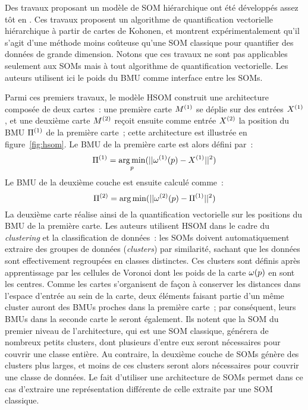\documentclass[../main]{subfiles}
\begin{document}
Des travaux proposant un modèle de SOM hiérarchique ont été développés assez tôt en \cite{luttrell_hierarchical_1989}. 
Ces travaux proposent un algorithme de quantification vectorielle hiérarchique à partir de cartes de Kohonen, et montrent expérimentalement qu'il s'agit d'une méthode moins coûteuse qu'une SOM classique pour quantifier des données de grande dimension. Notons que ces travaux ne sont pas applicables seulement aux SOMs mais à tout algorithme de quantification vectorielle. Les auteurs utilisent ici le poids du BMU comme interface entre les SOMs.

Parmi ces premiers travaux, le modèle HSOM \parencite{lampinen_clustering_1992} construit une architecture composée de deux cartes~: une première carte $M^{({1})}$ se déplie sur des entrées $X^{({1})}$, et une deuxième carte $M^{({2})}$ reçoit ensuite comme entrée $X^{({2})}$ la position du BMU $\Pi^{({1})}$ de la première carte~; cette architecture est illustrée en figure~\ref{fig:hsom}.
Le BMU de la première carte est alors défini par~:
$$ \Pi^{({1})} = \operatorname*{arg\,min}_p(||\omega^{({1})}(p) - X^{({1})} || ^2)$$
Le BMU de la deuxième couche est ensuite calculé comme~:
$$ \Pi^{({2})}= \operatorname*{arg\,min}(||\omega^{({2})}(p) - \Pi^{({1})} || ^2)$$
La deuxième carte réalise ainsi de la quantification vectorielle sur les positions du BMU de la première carte. Les auteurs utilisent HSOM dans le cadre du \emph{clustering} et la classification de données~: les SOMs doivent automatiquement extraire des groupes de données (\emph{clusters}) par similarité, sachant que les données sont effectivement regroupées en classes distinctes. Ces clusters sont définis après apprentissage par les cellules de Voronoi dont les poids de la carte $\omega(p)$ en sont les centres.
Comme les cartes s'organisent de façon à conserver les distances dans l'espace d'entrée au sein de la carte, deux éléments faisant partie d'un même cluster auront des BMUs proches dans la première carte~; par conséquent, leurs BMUs dans la seconde carte le seront également. 
Ils notent que la SOM du premier niveau de l'architecture, qui est une SOM classique, générera de nombreux petits clusters, dont plusieurs d'entre eux seront nécessaires pour couvrir une classe entière. Au contraire, la deuxième couche de SOMs génère des clusters plus larges, et moins de ces clusters seront alors nécessaires pour couvrir une classe de données.
Le fait d'utiliser une architecture de SOMs permet dans ce cas d'extraire une représentation différente de celle extraite par une SOM classique.
\end{document}
